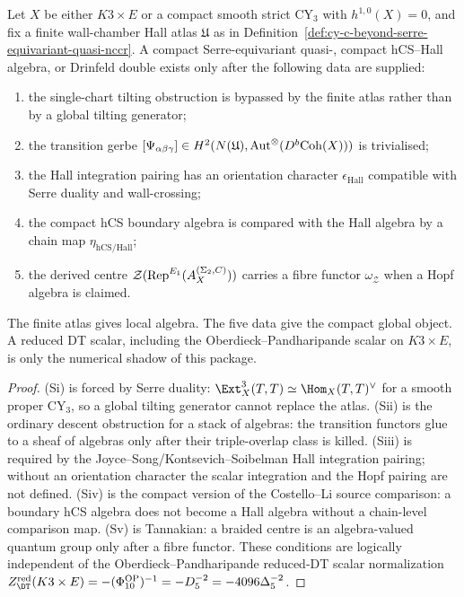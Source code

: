 \begin{proposition}
\label{prop:cy-c-beyond-serre-eq-quasi-nccr-5fold}
Let $X$ be either $K3\times E$ or a compact smooth strict CY$_3$ with
$h^{1,0}(X)=0$, and fix a finite wall-chamber Hall atlas
$\mathfrak U$ as in
Definition~\ref{def:cy-c-beyond-serre-equivariant-quasi-nccr}. A
compact Serre-equivariant quasi-\NCCR, compact hCS--Hall algebra, or
Drinfeld double exists only after the following data are supplied:
\begin{enumerate}[label=\textup{(S\roman*)}]
 \item the single-chart tilting obstruction is bypassed by the finite
 atlas rather than by a global tilting generator;
 \item the transition gerbe
 $[\Psi_{\alpha\beta\gamma}]\in H^2(N(\mathfrak U),
 \mathrm{Aut}^{\otimes}(D^b\mathrm{Coh}(X)))$ is trivialised;
 \item the Hall integration pairing has an orientation character
 $\epsilon_{\mathrm{Hall}}$ compatible with Serre duality and
 wall-crossing;
 \item the compact hCS boundary algebra is compared with the Hall
 algebra by a chain map $\eta_{\mathrm{hCS/Hall}}$;
 \item the derived centre
 $\mathcal Z(\mathrm{Rep}^{E_{1}}(A_X^{(\Sigma_2,C)}))$ carries a
 fibre functor $\omega_{\mathcal Z}$ when a Hopf algebra is claimed.
\end{enumerate}
The finite atlas gives local algebra. The five data give the compact
global object. A reduced DT scalar, including the
Oberdieck--Pandharipande scalar on $K3\times E$, is only the numerical
shadow of this package.
\end{proposition}

\begin{proof}
\textup{(Si)} is forced by Serre duality:
$\Ext_X^3(T,T)\simeq\Hom_X(T,T)^\vee$ for a smooth proper CY$_3$, so a
global tilting generator cannot replace the atlas. \textup{(Sii)} is
the ordinary descent obstruction for a stack of algebras: the
transition functors glue to a sheaf of algebras only after their
triple-overlap class is killed. \textup{(Siii)} is required by the
Joyce--Song/Kontsevich--Soibelman Hall integration pairing; without an
orientation character the scalar integration and the Hopf pairing are
not defined. \textup{(Siv)} is the compact version of the
Costello--Li source comparison: a boundary hCS algebra does not become
a Hall algebra without a chain-level comparison map. \textup{(Sv)} is
Tannakian: a braided centre is an algebra-valued quantum group only
after a fibre functor. These conditions are logically independent of
the Oberdieck--Pandharipande reduced-DT scalar normalization
$Z^{\mathrm{red}}_{\DT}(K3\times E)
=-(\Phi_{10}^{\mathrm{OP}})^{-1}=-D_5^{-2}
=-4096\Delta_5^{-2}$.
\end{proof}

